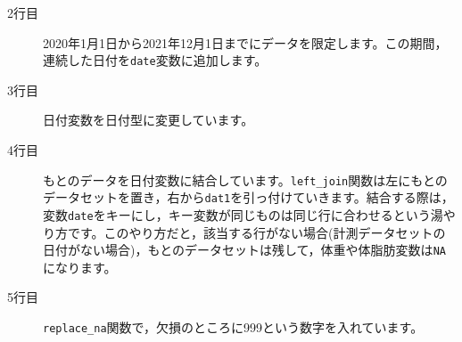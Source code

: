 \begin{description}
	\item[2行目] 2020年1月1日から2021年12月1日までにデータを限定します。この期間，連続した日付を\verb|date|変数に追加します。
	\item[3行目] 日付変数を日付型に変更しています。
	\item[4行目] もとのデータを日付変数に結合しています。\verb|left_join|関数は左にもとのデータセットを置き，右から\verb|dat1|を引っ付けていきます。結合する際は，変数\verb|date|をキーにし，キー変数が同じものは同じ行に合わせるという湯やり方です。このやり方だと，該当する行がない場合(計測データセットの日付がない場合)，もとのデータセットは残して，体重や体脂肪変数は\verb|NA|になります。
	\item[5行目] \verb|replace_na|関数で，欠損のところに999という数字を入れています。
\end{description}
